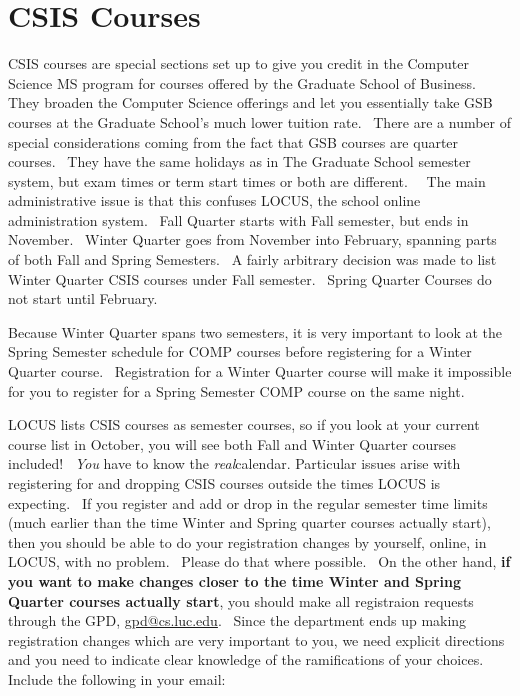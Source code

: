 \documentclass[letterpaper,10pt,english]{sphinxmanual}
\begin{document}
\section{CSIS Courses}
\label{regulations:csis-courses}
CSIS courses are special sections set up to give you credit in the
Computer Science MS program for courses offered by the Graduate School
of Business.  They broaden the Computer Science offerings and let you
essentially take GSB courses at the Graduate School's much lower tuition
rate.  There are a number of special considerations coming from the fact
that GSB courses are quarter courses.  They have the same holidays as in
The Graduate School semester system, but exam times or term start times
or both are different.   The main administrative issue is that this
confuses LOCUS, the school online administration system.  Fall Quarter
starts with Fall semester, but ends in November.  Winter Quarter goes
from November into February, spanning parts of both Fall and Spring
Semesters.  A fairly arbitrary decision was made to list Winter Quarter
CSIS courses under Fall semester.  Spring Quarter Courses do not start
until February.

Because Winter Quarter spans two semesters, it is very important to look
at the Spring Semester schedule for COMP courses before registering for
a Winter Quarter course.  Registration for a Winter Quarter course will
make it impossible for you to register for a Spring Semester COMP course
on the same night.

LOCUS lists CSIS courses as semester courses, so if you look at your
current course list in October, you will see both Fall and Winter
Quarter courses included!  \emph{You} have to know the \emph{real}calendar.
Particular issues arise with registering for and dropping CSIS courses
outside the times LOCUS is expecting.  If you register and add or drop
in the regular semester time limits (much earlier than the time Winter
and Spring quarter courses actually start), then you should be able to
do your registration changes by yourself, online, in LOCUS, with no
problem.  Please do that where possible.  On the other hand, \textbf{if you
want to make changes closer to the time Winter and Spring Quarter
courses actually start}, you should make all registraion requests
through the GPD, \href{mailto:gpd@cs.luc.edu}{gpd@cs.luc.edu}.  Since the department ends up making
registration changes which are very important to you, we need explicit
directions and you need to indicate clear knowledge of the ramifications
of your choices.  Include the following in your email:
\end{document}
